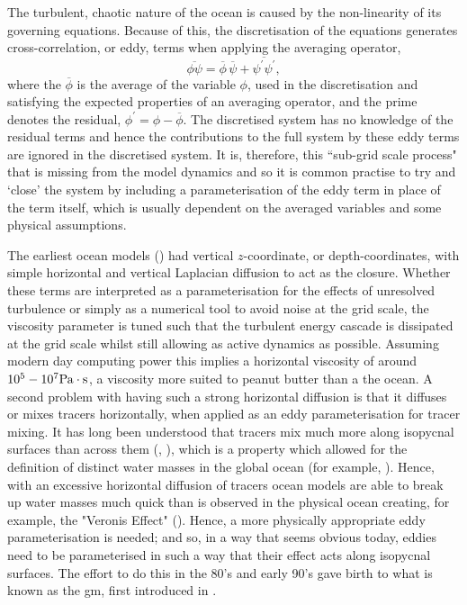 \documentclass[10pt,a4paper]{article}
\newcommand*\mean[1]{\overline{#1}}
\newcommand*\res[1]{{#1}^{\prime}}
\begin{document}
 The turbulent, chaotic nature of the ocean is caused by the non-linearity of its 
 governing equations. Because of this,  the discretisation of the equations generates cross-correlation, or eddy, terms when applying the 
 averaging operator,
 \begin{equation}
 \mean{\phi\psi} = \mean{\phi}\,\mean{\psi} + 
 \mean{\res{\psi}\res{\psi}},
 \label{non-lin average}
 \end{equation}
 where the ${\mean{\phi}}$ is the average of the variable ${\phi}$, used in
 the discretisation and satisfying
 the expected properties of an averaging operator, and the prime denotes the residual, ${\phi^{\prime} = \phi - \mean{\phi}}$.
 The discretised system has no knowledge of the residual terms and hence
 the contributions to the full system by these eddy terms are
 ignored in the discretised system. It is, therefore, this ``sub-grid scale process"
 that is missing from the model dynamics and so it is common practise to try and
 `close' the system by including a parameterisation of the eddy
 term in place of the term itself, which is usually dependent on the averaged 
 variables and some physical assumptions.
 
 The earliest ocean models (\cite{bryan1969numerical}) had vertical $z$-coordinate, or depth-coordinates, with simple horizontal and vertical Laplacian diffusion to act as 
 the closure. Whether these terms are interpreted as a parameterisation for the effects
 of unresolved turbulence or simply as a numerical tool to avoid noise at 
 the grid scale, the viscosity parameter is tuned such that the turbulent energy cascade is 
 dissipated at the grid scale whilst still allowing as active dynamics as possible. 
 Assuming modern day computing power this implies a horizontal viscosity of around 
 $10^{5} - 10^{7} \rm Pa \cdot s$, a viscosity more suited to peanut butter than 
 a the ocean. A second problem with having such a strong horizontal diffusion is
 that it diffuses or mixes tracers horizontally, when applied as
 an eddy parameterisation for tracer mixing. It has long been understood that tracers 
 mix much more along isopycnal surfaces than across them (\cite{iselin1939influence}, \cite{montgomery1940present}), which is a property which allowed for the definition of
 distinct water masses in the global ocean (for example, \cite{emery1986global}).
  Hence, with an excessive horizontal diffusion
 of tracers ocean models are able to break up water masses much quick than
 is observed in the physical ocean creating, for example, the "Veronis Effect" (\cite{veronis1975role}).
 Hence, a more physically appropriate eddy parameterisation 
 is needed;
  and so, in a way that seems obvious today, eddies need to be
   parameterised in 
 such a way that their effect acts along isopycnal surfaces. 
 The effort to do this in the 80's and early 90's gave birth
 to what is known as the \gls{gm}, first introduced in \cite{gent1990}.
 
\end{document}
